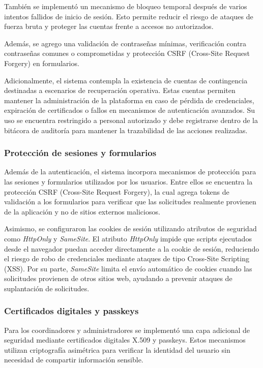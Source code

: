 \documentclass[10pt, letterpaper]{article}
\begin{document}
También se implementó un mecanismo de bloqueo temporal después de varios intentos fallidos de inicio de sesión. Esto permite reducir el riesgo de ataques de fuerza bruta y proteger las cuentas frente a accesos no autorizados.

Además, se agrego una validación de contraseñas mínimas, verificación contra contraseñas comunes o comprometidas y protección CSRF (Cross-Site Request Forgery) en formularios.

Adicionalmente, el sistema contempla la existencia de cuentas de contingencia destinadas a escenarios de recuperación operativa. Estas cuentas permiten mantener la administración de la plataforma en caso de pérdida de credenciales, expiración de certificados o fallos en mecanismos de autenticación avanzados. Su uso se encuentra restringido a personal autorizado y debe registrarse dentro de la bitácora de auditoría para mantener la trazabilidad de las acciones realizadas.

\subsubsection{Protección de sesiones y formularios}

Además de la autenticación, el sistema incorpora mecanismos de protección para las sesiones y formularios utilizados por los usuarios. Entre ellos se encuentra la protección CSRF (Cross-Site Request Forgery), la cual agrega tokens de validación a los formularios para verificar que las solicitudes realmente provienen de la aplicación y no de sitios externos maliciosos.

Asimismo, se configuraron las cookies de sesión utilizando atributos de seguridad como \textit{HttpOnly} y \textit{SameSite}. El atributo \textit{HttpOnly} impide que scripts ejecutados desde el navegador puedan acceder directamente a la cookie de sesión, reduciendo el riesgo de robo de credenciales mediante ataques de tipo Cross-Site Scripting (XSS). Por su parte, \textit{SameSite} limita el envío automático de cookies cuando las solicitudes provienen de otros sitios web, ayudando a prevenir ataques de suplantación de solicitudes.

\subsubsection{Certificados digitales y passkeys}

Para los coordinadores y administradores se implementó una capa adicional de seguridad mediante certificados digitales X.509 y passkeys. Estos mecanismos utilizan criptografía asimétrica para verificar la identidad del usuario sin necesidad de compartir información sensible.
\end{document}
